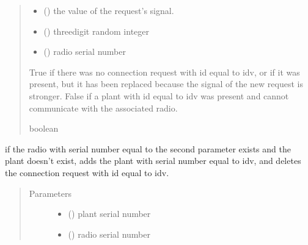 \documentclass[letterpaper,10pt,english]{sphinxmanual}
\begin{document}
\begin{fulllineitems}
\begin{quote}
\begin{description}
\begin{itemize}
\item {} 
 () \textendash{} the value of the request’s signal.

\item {} 
 () \textendash{} three\sphinxhyphen{}digit random integer

\item {} 
 () \textendash{} radio serial number

\end{itemize}

\item[{Returns}] \leavevmode
True \sphinxhyphen{} if there was no connection request with id equal to idv,
or if it was present, but it has been replaced
because the signal of the new request is stronger.
False \sphinxhyphen{} if a plant with id equal to idv was present
and cannot communicate with the associated radio.

\item[{Return type}] \leavevmode
boolean

\end{description}\end{quote}

\end{fulllineitems}


\begin{fulllineitems}
\label{\detokenize{index:controller.utility.add_plant}}
if the radio with serial number equal to the second parameter exists
and the plant doesn’t exist, adds the plant with serial number equal
to idv, and deletes the connection request with id equal to idv.
\begin{quote}\begin{description}
\item[{Parameters}] \leavevmode\begin{itemize}
\item {} 
 () \textendash{} plant serial number

\item {} 
 () \textendash{} radio serial number

\end{itemize}

\end{description}\end{quote}

\end{fulllineitems}
\end{document}
